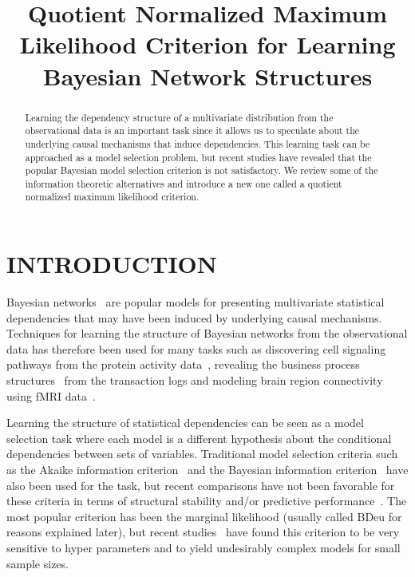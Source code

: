 \documentclass[letterpaper]{article}
\title{Quotient Normalized Maximum Likelihood Criterion for Learning Bayesian Network Structures}
\author{} %
\begin{document}
\maketitle

\begin{abstract}
Learning the dependency structure of a multivariate distribution from
the observational data is an important task since it allows us to
speculate about the underlying causal mechanisms that induce
dependencies. This learning task can be approached as a model
selection problem, but recent studies have revealed that the popular
Bayesian model selection criterion is not satisfactory. We review some
of the information theoretic alternatives and introduce a new one
called a quotient normalized maximum likelihood criterion.
\end{abstract}

\section{INTRODUCTION}
\label{sec:intro}
Bayesian networks~\cite{Pear88} are popular models for presenting
multivariate statistical dependencies that may have been induced by
underlying causal mechanisms.  Techniques for learning the structure
of Bayesian networks from the observational data has therefore been
used for many tasks such as discovering cell signaling pathways from
the protein activity data~\cite{bn4sigpath02}, revealing the business
process structures~\cite{bn4bpmining} from the transaction logs and
modeling brain region connectivity using fMRI
data~\cite{bn4brainconnect}.

Learning the structure of statistical dependencies can be seen as a
model selection task where each model is a different hypothesis about
the conditional dependencies between sets of variables. Traditional
model selection criteria such as the Akaike information
criterion~\cite{Akai73} and the Bayesian information
criterion~\cite{Schw78} have also been used for the task, but recent
comparisons have not been favorable for these criteria in terms of
structural stability and/or predictive
performance~\cite{cosco.pgm08a}.  The most popular criterion has been
the marginal likelihood (usually called BDeu for reasons explained
later), but recent studies~\cite{cosco.uai07,Steck08} have found this
criterion to be very sensitive to hyper parameters and to yield
undesirably complex models for small sample sizes.
\end{document}
